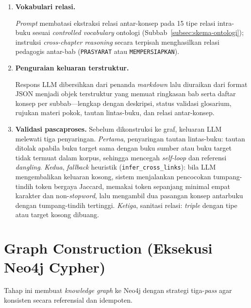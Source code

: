 \documentclass[main]{subfiles}
\begin{document}
\begin{enumerate}
  \item \textbf{Vokabulari relasi.}

  \textit{Prompt} membatasi ekstraksi relasi antar-konsep pada 15 tipe relasi
  intra-buku sesuai \textit{controlled vocabulary} ontologi
  (Subbab~\ref{subsec:skema-ontologi}); instruksi \textit{cross-chapter
  reasoning} secara terpisah menghasilkan relasi pedagogis antar-bab
  (\texttt{PRASYARAT} atau \texttt{MEMPERSIAPKAN}).

  \item \textbf{Penguraian keluaran terstruktur.}

  Respons LLM dibersihkan dari penanda \textit{markdown} lalu diuraikan dari
  format JSON menjadi objek terstruktur yang memuat ringkasan bab serta daftar
  konsep per subbab---lengkap dengan deskripsi, status validasi glosarium,
  rujukan materi pokok, tautan lintas-buku, dan relasi antar-konsep.

  \item \textbf{Validasi pascaproses.} Sebelum dikonstruksi ke graf, keluaran
  LLM melewati tiga penyaringan. \emph{Pertama}, penyaringan tautan lintas-buku:
  tautan ditolak apabila buku target sama dengan buku sumber atau buku target
  tidak termuat dalam korpus, sehingga mencegah \textit{self-loop} dan referensi
  \textit{dangling}. \emph{Kedua}, \textit{fallback} heuristik
  (\texttt{infer\_cross\_links}): bila LLM mengembalikan keluaran kosong, sistem
  menjalankan pencocokan tumpang-tindih token bergaya Jaccard, memakai token
  sepanjang minimal empat karakter dan non-\textit{stopword}, lalu mengambil dua
  pasangan konsep antarbuku dengan tumpang-tindih tertinggi. \emph{Ketiga},
  sanitasi relasi: \textit{triple} dengan tipe atau target kosong dibuang.
\end{enumerate}

\section{Graph Construction (Eksekusi Neo4j Cypher)}\label{sec:graph-construction}

Tahap ini membuat \textit{knowledge graph} ke Neo4j dengan strategi
tiga-\textit{pass} agar konsisten secara referensial dan idempoten.
\end{document}
